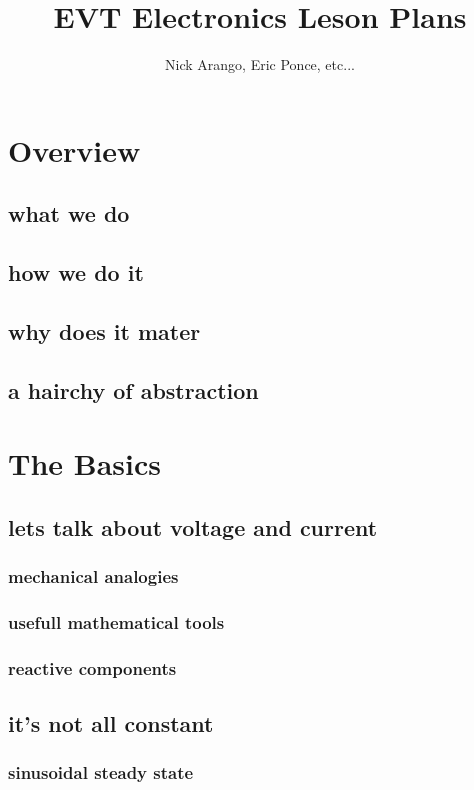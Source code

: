 \documentclass[]{journal}
\begin{document}
\title{EVT Electronics Leson Plans}
\author{Nick Arango, Eric Ponce, etc...}
\maketitle

\section{Overview}
	\subsection{what we do}
	\subsection{how we do it}
	\subsection{why does it mater} 
	\subsection{a hairchy of abstraction} 

\section{The Basics}
	\subsection{lets talk about voltage and current}
		\subsubsection{mechanical analogies}
		\subsubsection{usefull mathematical tools}
		\subsubsection{reactive components}
	\subsection{it's not all constant}
		\subsubsection{sinusoidal steady state}
\end{document}
